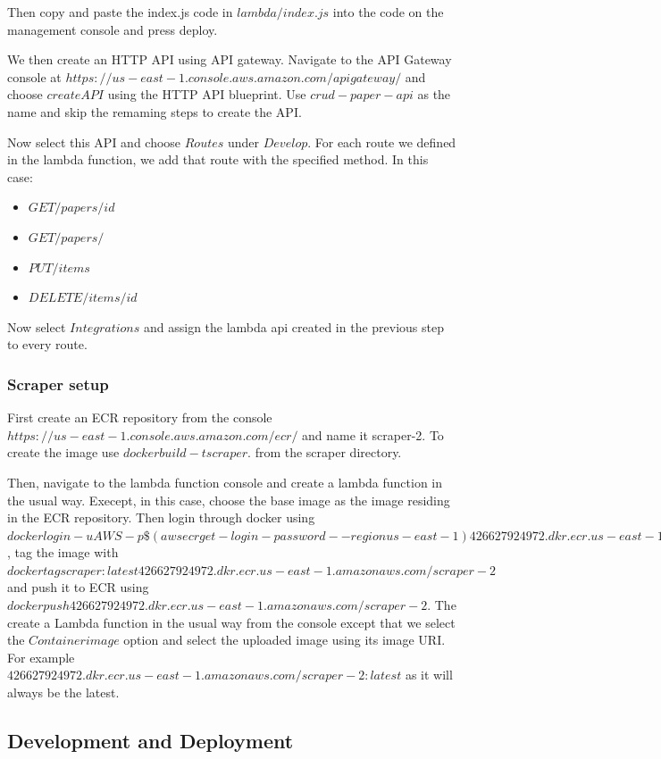 \documentclass[12pt]{article}
\begin{document}
Then copy and paste the index.js code in $lambda/index.js$ into the code on the management console and press deploy.

We then create an HTTP API using API gateway. Navigate to the API Gateway console at $https://us-east-1.console.aws.amazon.com/apigateway/$ and choose $create API$ using the HTTP API blueprint. Use $crud-paper-api$ as the name and skip the remaming steps to create the API. 

Now select this API and choose $Routes$ under $Develop$. For each route we defined in the lambda function, we add that route with the specified method. In this case: 

\begin{itemize}
    \item $GET /papers/{id} $
    \item $GET /papers/$
    \item $PUT /items$
    \item $DELETE /items/{id}$
\end{itemize}

Now select $Integrations$ and assign the lambda api created in the previous step to every route.

\subsubsection{Scraper setup}

First create an ECR repository from the console $https://us-east-1.console.aws.amazon.com/ecr/$ and name it scraper-2. To create the image use $docker build -t scraper .$ from the scraper directory. 

Then, navigate to the lambda function console and create a lambda function in the usual way. Execept, in this case, choose the base image as the image residing in the ECR repository. Then login through docker using $docker login -u AWS -p \$(aws ecr get-login-password --region us-east-1) 426627924972.dkr.ecr.us-east-1.amazonaws.com$, tag the image with $docker tag scraper:latest 426627924972.dkr.ecr.us-east-1.amazonaws.com/scraper-2$ and push it to ECR using $docker push 426627924972.dkr.ecr.us-east-1.amazonaws.com/scraper-2$. 
The create a Lambda function in the usual way from the console except that we select the $Container image$ option and select the uploaded image using its image URI. For example $426627924972.dkr.ecr.us-east-1.amazonaws.com/scraper-2:latest$ as it will always be the latest.

\subsection{Development and Deployment}
\end{document}

